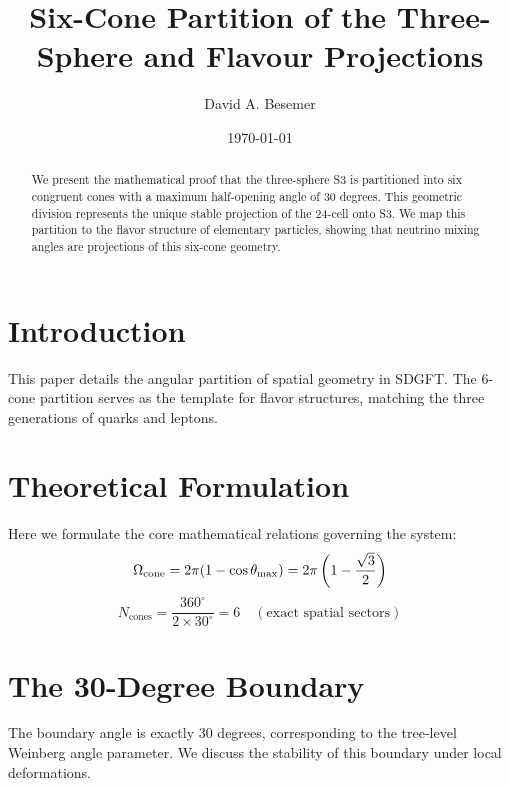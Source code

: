 \documentclass[amsmath,amssymb,aps,prd,twocolumn,superscriptaddress,nofootinbib]{revtex4-2}
\begin{document}

\title{Six-Cone Partition of the Three-Sphere and Flavour Projections}

\author{David A. Besemer}

\date{\today}

\begin{abstract}
We present the mathematical proof that the three-sphere S3 is partitioned into six congruent cones with a maximum half-opening angle of 30 degrees. This geometric division represents the unique stable projection of the 24-cell onto S3. We map this partition to the flavor structure of elementary particles, showing that neutrino mixing angles are projections of this six-cone geometry.
\end{abstract}

\maketitle

\section{Introduction}
This paper details the angular partition of spatial geometry in SDGFT. The 6-cone partition serves as the template for flavor structures, matching the three generations of quarks and leptons.

\section{Theoretical Formulation}
Here we formulate the core mathematical relations governing the system:
\begin{equation}
  \Omega_{\text{cone}} = 2\pi(1 - \cos\theta_{\mathrm{max}}) = 2\pi\left(1 - \frac{\sqrt{3}}{2}\right)
\end{equation}
\begin{equation}
  N_{\text{cones}} = \frac{360^\circ}{2\times 30^\circ} = 6 \quad (\text{exact spatial sectors})
\end{equation}
\section{The 30-Degree Boundary}
The boundary angle is exactly 30 degrees, corresponding to the tree-level Weinberg angle parameter. We discuss the stability of this boundary under local deformations.
\end{document}
